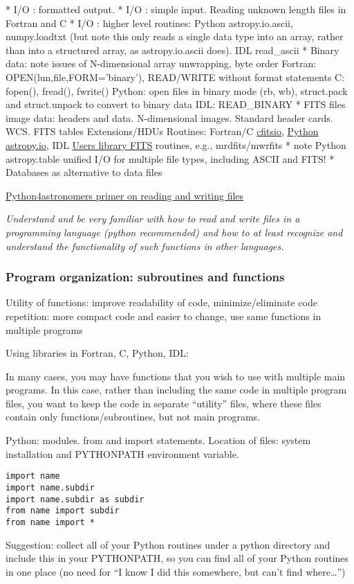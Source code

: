 \documentclass{article}
\newcommand{\test}[1]{%
    \begin{center}
        \colorbox{hl}{\parbox{0.9\textwidth}{\emph{\centering #1}}}
    \end{center}}
\begin{document}
* I/O : formatted output.
* I/O : simple input. Reading unknown length files in Fortran and C
* I/O : higher level routines: Python astropy.io.ascii, numpy.loadtxt
(but note this only reads a single data type into an array, rather
than into a structured array, as astropy.io.ascii does). IDL
read\_ascii
* Binary data: note issues of N-dimensional array unwrapping, byte order
Fortran: OPEN(lun,file,FORM='binary'), READ/WRITE without format
statements
C: fopen(), fread(), fwrite()
Python: open files in binary mode (rb, wb), struct.pack and
struct.unpack to convert to binary data
IDL: READ\_BINARY
* FITS files
image data: headers and data. N-dimensional images. Standard header
cards. WCS.
FITS tables
Extensions/HDUs
Routines: Fortran/C
\href{http://heasarc.gsfc.nasa.gov/fitsio/fitsio.html}
{cfitsio},
\href{http://astropy.readthedocs.io/en/latest/io/fits/index.html}
{Python astropy.io}, IDL
\href{http://idlastro.gsfc.nasa.gov/contents.html#C9}
{Users library FITS}
routines, e.g., mrdfits/mwrfits
* note Python astropy.table unified I/O for multiple file types,
including ASCII and FITS!
* Databases as alternative to data files

\href{https://python4astronomers.github.io/files/files.html}
{Python4astronomers primer on reading and writing files}

\test{Understand and be very familiar with how to read and write files
in a programming language (python recommended) and how to at least
recognize and understand the functionality of such functions in other
languages.}
\subsubsection{Program organization: subroutines and functions}
Utility of functions:
    improve readability of code,
    minimize/eliminate code repetition: more compact code and easier to
    change,
    use same functions in multiple programs

Using libraries in Fortran, C, Python, IDL:

In many cases, you may have functions that you wish to use with
multiple main programs. In this case, rather than including the same
code in multiple program files, you want to keep the code in separate
``utility'' files, where these files contain only
functions/subroutines, but not main programs.

Python: modules. from and import statements. Location of files: system
installation and PYTHONPATH environment variable.
\begin{verbatim}
import name
import name.subdir
import name.subdir as subdir
from name import subdir
from name import *
\end{verbatim}
Suggestion: collect all of your Python routines under a python
directory and include this in your PYTHONPATH, so you can find all of
your Python routines in one place (no need for ``I know I did this
somewhere, but can't find where\ldots'')
\end{document}
